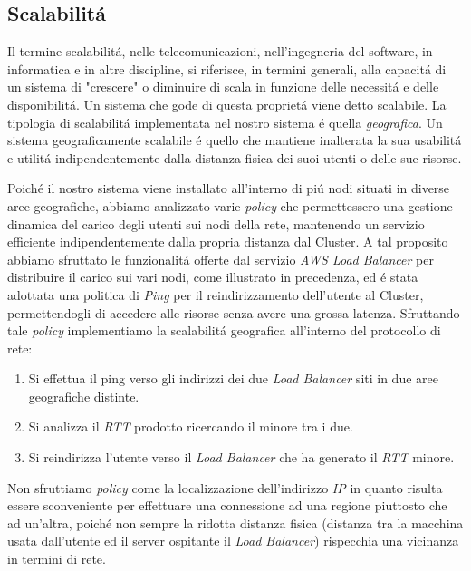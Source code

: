 \documentclass{sig-alternate-05-2015}
\begin{document}
\subsection{Scalabilit\'a}
Il termine scalabilit\'a, nelle telecomunicazioni, nell'ingegneria del software, in informatica e in altre discipline, si riferisce, in termini generali, alla capacit\'a di un sistema di "crescere" o diminuire di scala in funzione delle necessit\'a e delle disponibilit\'a. Un sistema che gode di questa propriet\'a viene detto scalabile.
La tipologia di scalabilit\'a implementata nel nostro sistema \'e quella \textit{geografica}.
Un sistema geograficamente scalabile \'e quello che mantiene inalterata la sua usabilit\'a e utilit\'a indipendentemente dalla distanza fisica dei suoi utenti o delle sue risorse.

Poich\'e il nostro sistema viene installato all'interno di pi\'u nodi situati in diverse aree geografiche, abbiamo analizzato varie \textit{policy} che permettessero una gestione dinamica del carico degli utenti sui nodi della rete, mantenendo un servizio efficiente indipendentemente dalla propria distanza dal Cluster. A tal proposito abbiamo sfruttato le funzionalit\'a offerte dal servizio \textit{AWS Load Balancer} per distribuire il carico sui vari nodi, come illustrato in precedenza, ed \'e stata adottata una politica di \textit{Ping} per il reindirizzamento dell'utente al Cluster, permettendogli di accedere alle risorse senza avere una grossa latenza.
Sfruttando tale \textit{policy} implementiamo la scalabilit\'a geografica all'interno del protocollo di rete:
\begin{enumerate}
\item Si effettua il ping verso gli indirizzi dei due \textit{Load Balancer} siti in due aree geografiche distinte.
\item Si analizza il \textit{RTT} prodotto ricercando il minore tra i due.
\item Si reindirizza l'utente verso il \textit{Load Balancer} che ha generato il \textit{RTT} minore.
\end{enumerate}
 
Non sfruttiamo \textit{policy} come la localizzazione dell'indirizzo \textit{IP} in quanto risulta essere sconveniente per effettuare una connessione ad una regione piuttosto che ad un'altra, poich\'e non sempre la ridotta distanza fisica (distanza tra la macchina usata dall'utente ed il server ospitante il \textit{Load Balancer}) rispecchia una vicinanza in termini di rete.
\end{document}
